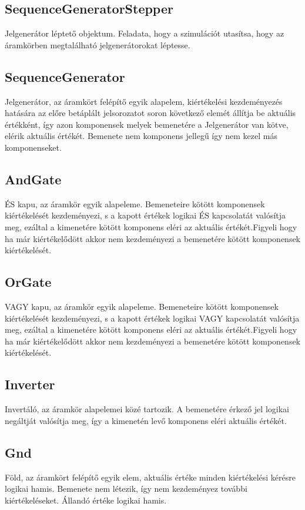 \subsection{\bf SequenceGeneratorStepper}
Jelgenerátor léptető objektum. Feladata, hogy a szimulációt utasítsa, hogy az áramkörben megtalálható jelgenerátorokat léptesse.

\subsection{\bf SequenceGenerator}
Jelgenerátor, az áramkört felépítő egyik alapelem, kiértékelési kezdeményezés hatására az előre betáplált jelsorozatot soron következő elemét állítja be aktuális értékként, így azon komponensek melyek bemenetére a Jelgenerátor van kötve, elérik aktuális értékét. Bemenete nem komponens jellegű így nem kezel más komponenseket.

\subsection{\bf AndGate}
ÉS kapu, az áramkör egyik alapeleme. Bemeneteire kötött komponensek kiértékelését kezdeményezi, s a kapott értékek logikai ÉS kapcsolatát valósítja meg, ezáltal a kimenetére kötött komponens eléri az aktuális értékét.Figyeli hogy ha már kiértékelődött akkor nem kezdeményezi a bemenetére kötött komponensek kiértékelését.

\subsection{\bf OrGate}
VAGY kapu, az áramkör egyik alapeleme. Bemeneteire kötött komponensek kiértékelését kezdeményezi, s a kapott értékek logikai VAGY kapcsolatát valósítja meg, ezáltal a kimenetére kötött komponens eléri az aktuális értékét.Figyeli hogy ha már kiértékelődött akkor nem kezdeményezi a bemenetére kötött komponensek kiértékelését.

\subsection{\bf Inverter}
Invertáló, az áramkör alapelemei közé tartozik. A bemenetére érkező jel logikai negáltját valósítja meg, így a kimenetén levő komponens eléri aktuális értékét.

\subsection{\bf Gnd}
Föld, az áramkört felépítő egyik elem, aktuális értéke minden kiértékelési kérésre logikai hamis. Bemenete nem létezik, így nem kezdeményez további kiértékeléseket. Állandó értéke logikai hamis.


